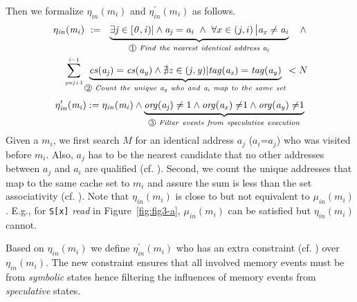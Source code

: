 \documentclass[sigconf]{acmart}
\newcommand*\circled[1]{\tikz[baseline=(char.base)]{
				\node[shape=circle,draw,inner sep=.4pt] (char) {\scriptsize{#1}};}}
\begin{document}
Then we formalize $\mathit{\eta_{in}(m_i)}$ and $\mathit{\eta^\prime_{in}(m_i)}$ as follows. 
%
\begin{multline}
  \label{eqn:hc1}
    \mathit{\eta_{in}(m_i)}~:=~~ 
     \underbrace{ 
      \exists\mathit{j}\in[\mathit{0,i})|
      \wedge 
      \mathit{a_j}=\mathit{a_i} 
    ~\wedge~
      {\forall}x\in\left(j,i\right)\big|\mathit{a_x}\ne\mathit{a_i}
    }_{{\circled{1}}\mathit{~Find~the~nearest~identical~address~a_j}}
		~~~\wedge 
		\\
    ~~~~\sum_{{\scriptscriptstyle \mathit{y=j}+1}}^{{\scriptscriptstyle \mathit{i-}1}} 
    \underbrace{
      \mathit{cs(a_j)}=\mathit{cs(a_y)} 
      \wedge
      \nexists\mathit{z}\in(\mathit{j,y})|\mathit{tag(a_z)}=\mathit{tag(a_y)}
    }_{{\circled{2}}\mathit{~Count~the~unique~a_y~who~and~a_i~map~to~the~same~set}}
    <N
\end{multline}
\vspace{.2ex}
\begin{multline}
  \label{eqn:hc2}
    \mathit{\eta^\prime_{in}(m_i)}:=\mathit{\eta_{in}(m_i)}\wedge
    \underbrace{
      \mathit{org(a_j)}\ne1 
      \wedge
      \mathit{org(a_x)\ne}1 
      \wedge
      \mathit{org(a_y)\ne}1 
    }_{{\circled{3}}\mathit{~Filter~events~from~speculative~execution}}
\end{multline}
%
%
Given a $\mathit{m_i}$, we first search $\mathit{M}$ for an identical 
address $\mathit{a_j}$ ($\mathit{a_i}$=$\mathit{a_j}$) who was 
visited before $\mathit{m_i}$. Also, $\mathit{a_j}$ has to be the nearest 
candidate that no other addresses between $\mathit{a_j}$ and $\mathit{a_i}$ 
are qualified (cf. \circled{1}). Second, we count the unique addresses that 
map to the same cache set to $\mathit{m_i}$ and assure the sum is less than 
the set associativity (cf. \circled{2}). Note that $\mathit{\eta_{in}(m_i)}$ 
is close to but not equivalent to $\mathit{\mu_{in}(m_i)}$. E.g., for 
\texttt{S[x]} \textit{read} in Figure~\ref{fig:fig3-a}, $\mathit{\mu_{in}(m_i)}$ 
can be satisfied but $\mathit{\eta_{in}(m_i)}$ cannot.

Based on $\mathit{\eta_{in}(m_i)}$ we define $\mathit{\eta^\prime_{in}(m_i)}$
who has an extra constraint (cf. \circled{3}) over $\mathit{\eta_{in}(m_i)}$. 
The new constraint ensures that all involved memory events must be from 
\textit{symbolic} states hence filtering the influences of memory events 
from \textit{speculative} states.
\end{document}

